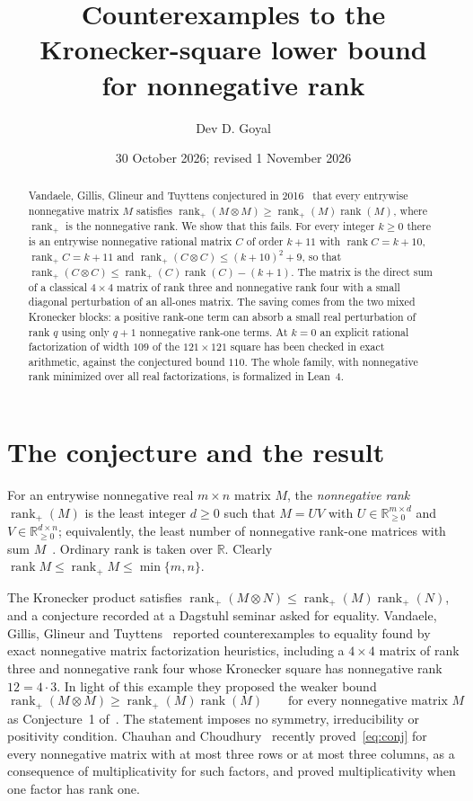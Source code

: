 \documentclass[11pt]{article}
\title{\textbf{Counterexamples to the Kronecker-square lower bound\\for nonnegative rank}}
\author{Dev D. Goyal}
\date{30 October 2026; revised 1 November 2026}
\theoremstyle{remark}
\newcommand{\rk}{\operatorname{rank}}
\newcommand{\rp}{\operatorname{rank}_+}
\begin{document}
\maketitle

\begin{abstract}
Vandaele, Gillis, Glineur and Tuyttens conjectured in 2016~\cite{VGGT} that every entrywise nonnegative matrix $M$ satisfies $\rp(M\otimes M)\ge\rp(M)\rk(M)$, where $\rp$ is the nonnegative rank. We show that this fails. For every integer $k\ge0$ there is an entrywise nonnegative rational matrix $C$ of order $k+11$ with $\rk C=k+10$, $\rp C=k+11$ and $\rp(C\otimes C)\le(k+10)^2+9$, so that $\rp(C\otimes C)\le\rp(C)\rk(C)-(k+1)$. The matrix is the direct sum of a classical $4\times4$ matrix of rank three and nonnegative rank four with a small diagonal perturbation of an all-ones matrix. The saving comes from the two mixed Kronecker blocks: a positive rank-one term can absorb a small real perturbation of rank $q$ using only $q+1$ nonnegative rank-one terms. At $k=0$ an explicit rational factorization of width $109$ of the $121\times121$ square has been checked in exact arithmetic, against the conjectured bound $110$. The whole family, with nonnegative rank minimized over all real factorizations, is formalized in Lean~4.
\end{abstract}

\section{The conjecture and the result}\label{sec:result}

For an entrywise nonnegative real $m\times n$ matrix $M$, the \emph{nonnegative rank} $\rp(M)$ is the least integer $d\ge0$ such that $M=UV$ with $U\in\mathbb{R}_{\ge0}^{m\times d}$ and $V\in\mathbb{R}_{\ge0}^{d\times n}$; equivalently, the least number of nonnegative rank-one matrices with sum $M$~\cite{CR}. Ordinary rank is taken over $\mathbb{R}$. Clearly $\rk M\le\rp M\le\min\{m,n\}$.

The Kronecker product satisfies $\rp(M\otimes N)\le\rp(M)\rp(N)$, and a conjecture recorded at a Dagstuhl seminar asked for equality. Vandaele, Gillis, Glineur and Tuyttens~\cite{VGGT} reported counterexamples to equality found by exact nonnegative matrix factorization heuristics, including a $4\times4$ matrix of rank three and nonnegative rank four whose Kronecker square has nonnegative rank $12=4\cdot3$. In light of this example they proposed the weaker bound
\begin{equation}\label{eq:conj}
\rp(M\otimes M)\ge\rp(M)\rk(M)\qquad\text{for every nonnegative matrix }M
\end{equation}
as Conjecture~1 of~\cite[\S6.1]{VGGT}. The statement imposes no symmetry, irreducibility or positivity condition. Chauhan and Choudhury~\cite{CC} recently proved~\eqref{eq:conj} for every nonnegative matrix with at most three rows or at most three columns, as a consequence of multiplicativity for such factors, and proved multiplicativity when one factor has rank one.
\end{document}
